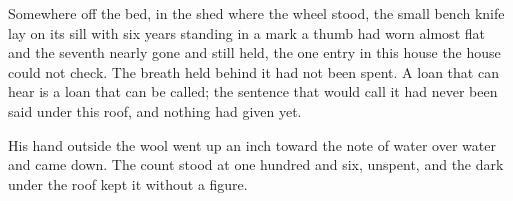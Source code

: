 Somewhere off the bed, in the shed where the wheel stood, the small bench knife lay on its sill with six years standing in a mark a thumb had worn almost flat and the seventh nearly gone and still held, the one entry in this house the house could not check. The breath held behind it had not been spent. A loan that can hear is a loan that can be called; the sentence that would call it had never been said under this roof, and nothing had given yet.

His hand outside the wool went up an inch toward the note of water over water and came down. The count stood at one hundred and six, unspent, and the dark under the roof kept it without a figure.
